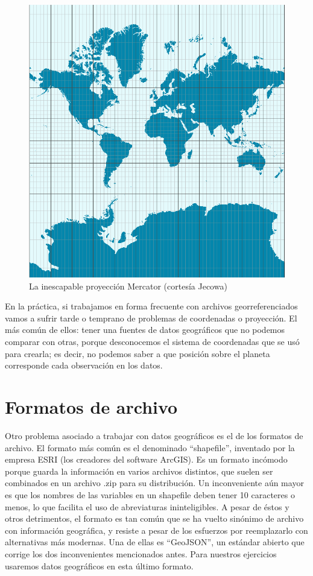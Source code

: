 \documentclass[]{book}
\begin{document}
\begin{figure}
\includegraphics[width=1\linewidth]{imagenes/Mercator-proj} \caption{La inescapable proyección Mercator (cortesía Jecowa)}\label{fig:unnamed-chunk-138}
\end{figure}

En la práctica, si trabajamos en forma frecuente con archivos
georreferenciados vamos a sufrir tarde o temprano de problemas de
coordenadas o proyección. El más común de ellos: tener una fuentes de
datos geográficos que no podemos comparar con otras, porque desconocemos
el sistema de coordenadas que se usó para crearla; es decir, no podemos
saber a que posición sobre el planeta corresponde cada observación en
los datos.

\section{Formatos de archivo}\label{formatos-de-archivo}

Otro problema asociado a trabajar con datos geográficos es el de los
formatos de archivo. El formato más común es el denominado
``shapefile'', inventado por la empresa ESRI (los creadores del software
ArcGIS). Es un formato incómodo porque guarda la información en varios
archivos distintos, que suelen ser combinados en un archivo .zip para su
distribución. Un inconveniente aún mayor es que los nombres de las
variables en un shapefile deben tener 10 caracteres o menos, lo que
facilita el uso de abreviaturas ininteligibles. A pesar de éstos y otros
detrimentos, el formato es tan común que se ha vuelto sinónimo de
archivo con información geográfica, y resiste a pesar de los esfuerzos
por reemplazarlo con alternativas más modernas. Una de ellas es
``GeoJSON'', un estándar abierto que corrige los dos inconvenientes
mencionados antes. Para nuestros ejercicios usaremos datos geográficos
en esta último formato.
\end{document}
